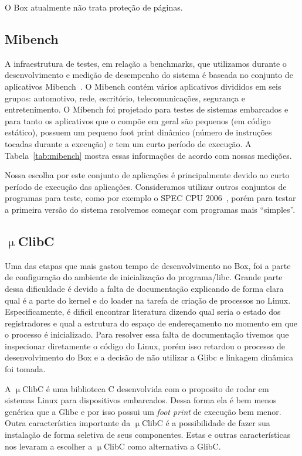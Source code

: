 \documentclass[11pt,twoside]{article}
\begin{document}
O Box atualmente não trata proteção de páginas.

\subsection{Mibench}

A infraestrutura de testes, em relação a benchmarks, que utilizamos durante
o desenvolvimento e medição de desempenho do sistema é baseada no conjunto
de aplicativos Mibench~\cite{mibench}. O Mibench contém vários aplicativos
divididos em seis grupos: automotivo, rede, escritório, telecomunicações,
segurança e entretenimento. O Mibench foi projetado para testes de sistemas
embarcados e para tanto os aplicativos que o compõe em geral são pequenos 
(em código estático), possuem um pequeno foot print dinâmico (número de
instruções tocadas durante a execução) e tem um curto período de execução.
A Tabela~\ref{tab:mibench} mostra essas informações de acordo com nossas
medições.

Nossa escolha por este conjunto de aplicações é principalmente devido ao
curto período de execução das aplicações. Consideramos utilizar outros
conjuntos de programas para teste, como por exemplo o SPEC CPU 2006~\cite{spec2006},
porém para testar a primeira versão do sistema resolvemos começar com
programas mais ``simples''.

\subsection{$\upmu$ClibC}

Uma das etapas que mais gastou tempo de desenvolvimento no Box, foi a 
parte de configuração do ambiente de inicialização do programa/libc. 
Grande parte dessa dificuldade é devido a falta de documentação 
explicando de forma clara qual é a parte do kernel e do loader na
tarefa de criação de processos no Linux. Especificamente, é dificil
encontrar literatura dizendo qual seria o estado dos registradores e
qual a estrutura do espaço de endereçamento no momento em que o 
processo é inicializado. Para resolver essa falta de documentação
tivemos que inspecionar diretamente o código do Linux, porém isso
retardou o processo de desenvolvimento do Box e a decisão de não
utilizar a Glibc e linkagem dinâmica foi tomada.

A $\upmu$ClibC é uma biblioteca C desenvolvida com o proposito de
rodar em sistemas Linux para dispositivos embarcados. Dessa forma 
ela é bem menos genérica que a Glibc e por isso possui um \textit{foot print}
de execução bem menor. Outra característica importante da $\upmu$ClibC
é a possibilidade de fazer sua instalação de forma seletiva de
seus componentes. Estas e outras características nos levaram a
escolher a $\upmu$ClibC como alternativa a GlibC.
\end{document}
